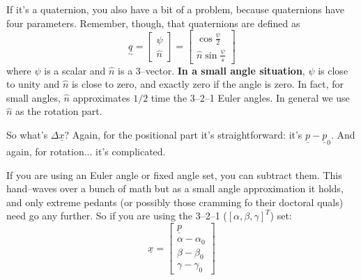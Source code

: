 \documentclass[]{article}
\begin{document}
If it's a quaternion, you also have a bit of a problem, because quaternions have four parameters. Remember, though, that quaternions are defined as 
\begin{displaymath}
	\underset{\sim}{q} = \left[ \begin{array}{c} \psi \\ \hat{n} \end{array} \right] = \left[\begin{array}{c} \cos \frac{\psi}{2} \\ \hat{n} \sin \frac{\psi}{s} \end{array} \right]
\end{displaymath}
where $\psi$ is a scalar and $\hat{n}$ is a 3--vector. \textbf{In a small angle situation}, $\psi$ is close to unity and $\hat{n}$ is close to zero, and exactly zero if the angle is zero. In fact, for small angles, $\hat{n}$ approximates $1/2$ time the 3--2--1 Euler angles.  In general we use $\hat{n}$ as the rotation part.

So what's $\Delta \underline{x}$? Again, for the positional part it's straightforward: it's $\underline{p}-\underline{p}_{0}$. And again, for rotation... it's complicated.

If you are using an Euler angle or fixed angle set, you can subtract them. This hand--waves over a bunch of math but as a small angle approximation it holds, and only extreme pedants (or possibly those cramming fo their doctoral quals) need go any further. So if you are using the 3--2--1 ($\left[\alpha, \beta, \gamma\right]^{T}$) set:
\begin{displaymath}
\underline{x} = \left[ \begin{array}{c} \underline{p} \\ \alpha-\alpha_{0} \\ \beta-\beta_{0} \\ \gamma-\gamma_{0} \end{array}\right]
\end{displaymath}
\end{document}
